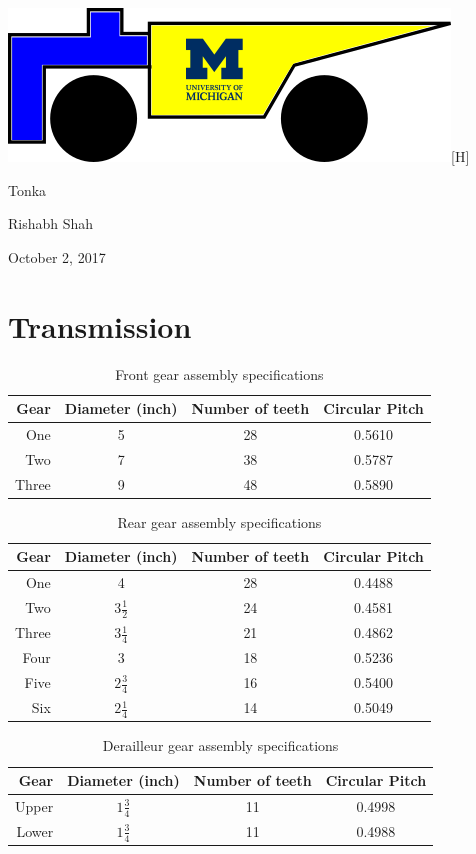 \documentclass[11pt]{article}
\begin{document}
{\large\noindent \includegraphics{Logo}[H]

\noindent Tonka

\noindent Rishabh Shah

\noindent October 2, 2017}

\section*{Transmission}
\begin{table}[H]
	\centering
	\begin{tabular}{|r|c|c|c|}
		\hline
		\textbf{Gear} & \textbf{Diameter (inch)} & \textbf{Number of teeth} & \textbf{Circular Pitch}\\
		\hline
		One & 5 & 28 & 0.5610 \\
		\hline
		Two & 7 & 38 & 0.5787 \\
		\hline
		Three & 9 & 48 & 0.5890 \\
		\hline
	\end{tabular}
	\caption{Front gear assembly specifications}
\end{table}
\begin{table}[H]
	\centering
	\begin{tabular}{|r|c|c|c|}
		\hline
		\textbf{Gear} & \textbf{Diameter (inch)} & \textbf{Number of teeth} & \textbf{Circular Pitch} \\
		\hline
		One & 4 & 28 & 0.4488 \\
		\hline
		Two & \(3\frac{1}{2}\) & 24 & 0.4581 \\
		\hline
		Three & \(3\frac{1}{4}\) & 21 & 0.4862 \\
		\hline
		Four & 3 & 18 & 0.5236 \\
		\hline
		Five & \(2\frac{3}{4}\) & 16 & 0.5400 \\
		\hline
		Six & \(2\frac{1}{4}\) & 14 & 0.5049 \\
		\hline
	\end{tabular}
	\caption{Rear gear assembly specifications}
\end{table}
\begin{table}[H]
	\centering
	\begin{tabular}{|r|c|c|c|}
		\hline
		\textbf{Gear} & \textbf{Diameter (inch)} & \textbf{Number of teeth} & \textbf{Circular Pitch} \\
		\hline
		Upper & \(1\frac{3}{4}\) & 11 & 0.4998 \\
		\hline
		Lower & \(1\frac{3}{4}\) & 11 & 0.4988 \\
		\hline
	\end{tabular}
	\caption{Derailleur gear assembly specifications}
\end{table}
\end{document}
